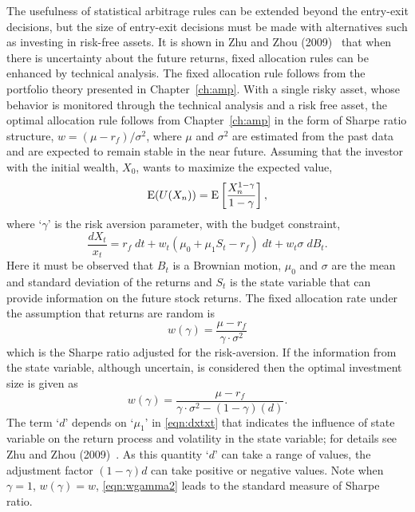 The usefulness of statistical arbitrage rules can be extended beyond the entry-exit decisions, but the size of entry-exit decisions must be made with alternatives such as investing in risk-free assets. It is shown in Zhu and Zhou (2009)~\cite{zhuzhou09} that when there is uncertainty about the future returns, fixed allocation rules can be enhanced by technical analysis. The fixed allocation rule follows from the portfolio theory presented in Chapter~\ref{ch:amp}. With a single risky asset, whose behavior is monitored through the technical analysis and a risk free asset, the optimal allocation rule follows from Chapter~\ref{ch:amp} in the form of Sharpe ratio structure, $w= (\mu - r_f)/\sigma^2$, where $\mu$ and $\sigma^2$ are estimated from the past data and are expected to remain stable in the near future. Assuming that the investor with the initial wealth, $X_0$, wants to maximize the expected value,
	\begin{equation} \label{eqn:euxn}
	\Ex(U(X_n))= \Ex\left[ \dfrac{X_n^{1-\gamma}}{1 - \gamma}\right],
	\end{equation}
where `$\gamma$' is the risk aversion parameter, with the budget constraint,
	\begin{equation} \label{eqn:dxtxt}
	\dfrac{dX_t}{x_t}= r_f \; dt + w_t (\mu_0 + \mu_1 S_t - r_f) \; dt + w_t \sigma \; dB_t.
	\end{equation}
Here it must be observed that $B_t$ is a Brownian motion, $\mu_0$ and $\sigma$ are the mean and standard deviation of the returns and $S_t$ is the state variable that can provide information on the future stock returns. The fixed allocation rate under the assumption that returns are random is
	\begin{equation} \label{eqn:wgamma}
	w(\gamma)= \dfrac{\mu - r_f}{\gamma \cdot \sigma^2}
	\end{equation}
which is the Sharpe ratio adjusted for the risk-aversion. If the information from the state variable, although uncertain, is considered then the optimal investment size is given as
	\begin{equation} \label{eqn:wgamma2}
	w(\gamma)= \dfrac{\mu - r_f}{\gamma \cdot \sigma^2 - (1-\gamma)(d)}.
	\end{equation}
The term `$d$' depends on `$\mu_1$' in \eqref{eqn:dxtxt} that indicates the influence of state variable on the return process and volatility in the state variable; for details see Zhu and Zhou (2009)~\cite{zhuzhou09}. As this quantity `$d$' can take a range of values, the adjustment factor $(1-\gamma)d$ can take positive or negative values. Note when $\gamma=1$, $w(\gamma)= w$, \eqref{eqn:wgamma2} leads to the standard measure of Sharpe ratio. 


